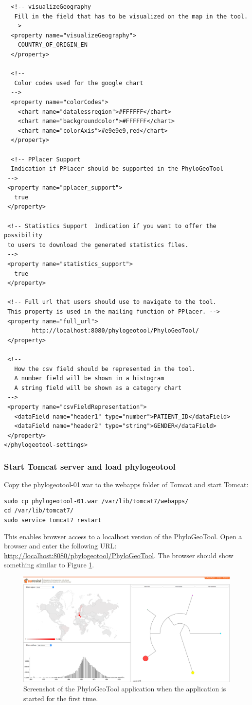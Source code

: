\documentclass[a4paper, 11pt]{article} %
\begin{document}
\begin{verbatim}
  <!-- visualizeGeography 
   Fill in the field that has to be visualized on the map in the tool.
  -->
  <property name="visualizeGeography">
  	COUNTRY_OF_ORIGIN_EN
  </property>

  <!-- 
   Color codes used for the google chart
  -->
  <property name="colorCodes">
    <chart name="datalessregion">#FFFFFF</chart>
    <chart name="backgroundcolor">#FFFFFF</chart>    
    <chart name="colorAxis">#e9e9e9,red</chart>
  </property>
  
  <!-- PPlacer Support
  Indication if PPlacer should be supported in the PhyloGeoTool
 -->
 <property name="pplacer_support">
   true
 </property>
 
 <!-- Statistics Support  Indication if you want to offer the possibility 
 to users to download the generated statistics files.
 -->
 <property name="statistics_support">
   true
 </property>
 
 <!-- Full url that users should use to navigate to the tool. 
 This property is used in the mailing function of PPlacer. -->
 <property name="full_url">
        http://localhost:8080/phylogeotool/PhyloGeoTool/
 </property>

 <!--
   How the csv field should be represented in the tool.
   A number field will be shown in a histogram
   A string field will be shown as a category chart
 -->
 <property name="csvFieldRepresentation">
   <dataField name="header1" type="number">PATIENT_ID</dataField>
   <dataField name="header2" type="string">GENDER</dataField>
 </property>
</phylogeotool-settings>
\end{verbatim}



\subsubsection{Start Tomcat server and load phylogeotool}

Copy the phylogeotool-01.war to the webapps folder of Tomcat and start Tomcat:
\begin{verbatim}
sudo cp phylogeotool-01.war /var/lib/tomcat7/webapps/
cd /var/lib/tomcat7/
sudo service tomcat7 restart
\end{verbatim}
This enables browser access to a localhost version of the PhyloGeoTool.
Open a browser and enter the following URL: \url{http://localhost:8080/phylogeotool/PhyloGeoTool}.
The browser should show something similar to Figure \ref{fig:01}.



\begin{figure}[!htbp]
\includegraphics[scale=0.19]{images/defaultScreenshot.png}
\caption{Screenshot of the PhyloGeoTool application when the application is started for the first time.}
\label{fig:01} 
\end{figure}
\end{document}
